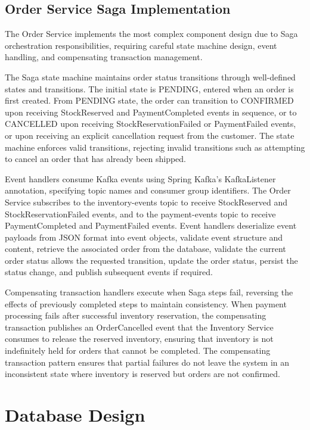 \subsection{Order Service Saga Implementation}

The Order Service implements the most complex component design due to Saga orchestration responsibilities, requiring careful state machine design, event handling, and compensating transaction management.

The Saga state machine maintains order status transitions through well-defined states and transitions. The initial state is PENDING, entered when an order is first created. From PENDING state, the order can transition to CONFIRMED upon receiving StockReserved and PaymentCompleted events in sequence, or to CANCELLED upon receiving StockReservationFailed or PaymentFailed events, or upon receiving an explicit cancellation request from the customer. The state machine enforces valid transitions, rejecting invalid transitions such as attempting to cancel an order that has already been shipped.

Event handlers consume Kafka events using Spring Kafka's KafkaListener annotation, specifying topic names and consumer group identifiers. The Order Service subscribes to the inventory-events topic to receive StockReserved and StockReservationFailed events, and to the payment-events topic to receive PaymentCompleted and PaymentFailed events. Event handlers deserialize event payloads from JSON format into event objects, validate event structure and content, retrieve the associated order from the database, validate the current order status allows the requested transition, update the order status, persist the status change, and publish subsequent events if required.

Compensating transaction handlers execute when Saga steps fail, reversing the effects of previously completed steps to maintain consistency. When payment processing fails after successful inventory reservation, the compensating transaction publishes an OrderCancelled event that the Inventory Service consumes to release the reserved inventory, ensuring that inventory is not indefinitely held for orders that cannot be completed. The compensating transaction pattern ensures that partial failures do not leave the system in an inconsistent state where inventory is reserved but orders are not confirmed.

\section{Database Design}

